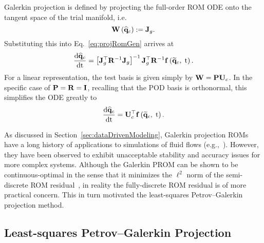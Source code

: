Galerkin projection is defined by projecting the full-order ROM ODE onto the tangent space of the trial manifold, i.e.
%
\begin{equation}
    \testBasis\left(\consVecCoef\right) \defEq \jacobDecode.
\end{equation}
%
Substituting this into Eq.~\ref{eq:projRomGen} arrives at
%
\begin{equation}\label{eq:galerkinROMODE}
    \ode{\consVecCoef}{\timeVar} = \left[\jacobDecode^\top \resScaleInv \jacobDecode\right]^{-1} \jacobDecode^\top \resScaleInv \rhsFunc{\consVecRom, \; \timeVar}.
\end{equation}
%
For a linear representation, the test basis is given simply by $\testBasis = \consScale \consTrial$. In the specific case of $\consScale = \resScale = \identMat$, recalling that the POD basis is orthonormal, this simplifies the ODE greatly to
%
\begin{equation}
    \ode{\consVecCoef}{\timeVar} = \consTrial^\top \rhsFunc{\consVecRom, \; \timeVar}.
\end{equation} 

As discussed in Section~\ref{sec:dataDrivenModeling}, Galerkin projection ROMs have a long history of applications to simulations of fluid flows (e.g.,~\cite{Aubry1988,Cazemier1998,BuiThanh2007}). However, they have been observed to exhibit unacceptable stability and accuracy issues for more complex systems. Although the Galerkin PROM can be shown to be continuous-optimal in the sense that it minimizes the $\ell^2$ norm of the semi-discrete ROM residual~\cite{Carlberg2017}, in reality the fully-discrete ROM residual is of more practical concern. This in turn motivated the least-squares Petrov--Galerkin projection method.

\subsection{Least-squares Petrov--Galerkin Projection}


